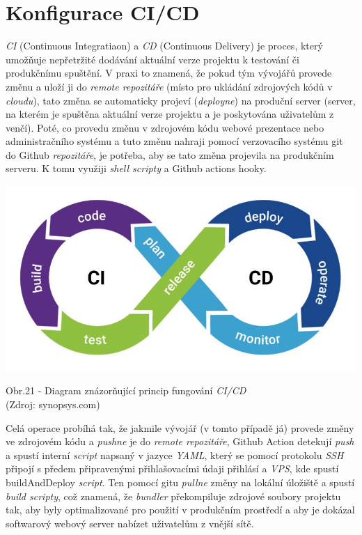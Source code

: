 \documentclass[12pt,a4paper]{report}
\begin{document}
  \section{Konfigurace CI/CD}
  \emph{CI} (Continuous Integratiaon) a \emph{CD} (Continuous Delivery) je proces, který umožňuje nepřetržité 
  dodávání aktuální verze projektu k testování či produkčnímu spuštění. V praxi to znamená,
  že pokud tým vývojářů provede změnu a uloží ji do \emph{remote repozitáře}
  (místo pro ukládání zdrojových kódů v \emph{cloudu}), tato změna se automaticky projeví (\emph{deployne})
  na produční server (server, na kterém je spuštěna aktuální verze projektu a je poskytována
  uživatelům z venčí).
  Poté, co provedu změnu v zdrojovém kódu webové prezentace nebo administračního systému a 
  tuto změnu nahraji pomocí verzovacího systému git do Github \emph{repozitáře}, je potřeba, aby se 
  tato změna projevila na produkčním serveru. K tomu využiji \emph{shell scripty} a Github actions hooky.

  \vspace*{0.5cm}
  \noindent\includegraphics[width=\linewidth]{CICD.jpg}
  \begin{center}
    Obr.21 - Diagram znázorňující princip fungování \emph{CI/CD}   \\
    (Zdroj: synopsys.com)
  \end{center}
  \vspace*{0.5cm}

  Celá operace probíhá tak, že jakmile vývojář (v tomto případě já) provede změny ve zdrojovém kódu
  a \emph{pushne} je do \emph{remote repozitáře}, Github Action detekují \emph{push} a spustí interní \emph{script} napsaný
  v jazyce \emph{YAML}, který se pomocí protokolu \emph{SSH} připojí s předem připravenými přihlašovacími
  údaji přihlásí a \emph{VPS}, kde spustí buildAndDeploy \emph{script}. Ten pomocí gitu \emph{pullne} změny na lokální úložiště 
  a spustí \emph{build scripty}, což znamená, že \emph{bundler} překompiluje zdrojové soubory projektu tak, aby byly 
  optimalizované pro použití v produkčním prostředí a aby je dokázal softwarový webový server nabízet uživatelům z vnější sítě.
  
\end{document}
